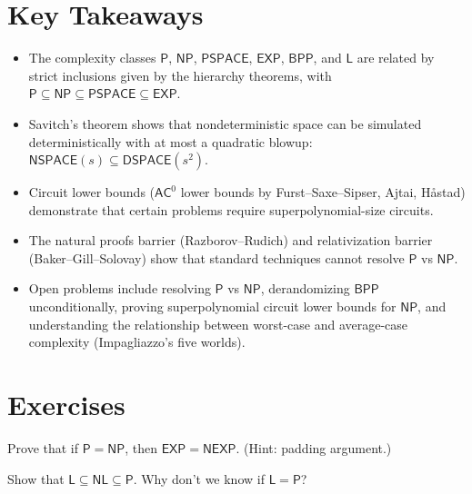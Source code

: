 \section*{Key Takeaways}
\begin{itemize}
\item The complexity classes $\mathsf{P}$, $\mathsf{NP}$, $\mathsf{PSPACE}$, $\mathsf{EXP}$, $\mathsf{BPP}$, and $\mathsf{L}$ are related by strict inclusions given by the hierarchy theorems, with $\mathsf{P} \subseteq \mathsf{NP} \subseteq \mathsf{PSPACE} \subseteq \mathsf{EXP}$.
\item Savitch's theorem shows that nondeterministic space can be simulated deterministically with at most a quadratic blowup: $\mathsf{NSPACE}(s) \subseteq \mathsf{DSPACE}(s^2)$.
\item Circuit lower bounds ($\mathsf{AC}^0$ lower bounds by Furst--Saxe--Sipser, Ajtai, Håstad) demonstrate that certain problems require superpolynomial-size circuits.
\item The natural proofs barrier (Razborov--Rudich) and relativization barrier (Baker--Gill--Solovay) show that standard techniques cannot resolve $\mathsf{P}$ vs $\mathsf{NP}$.
\item Open problems include resolving $\mathsf{P}$ vs $\mathsf{NP}$, derandomizing $\mathsf{BPP}$ unconditionally, proving superpolynomial circuit lower bounds for $\mathsf{NP}$, and understanding the relationship between worst-case and average-case complexity (Impagliazzo's five worlds).
\end{itemize}

\section{Exercises}
\label{sec:complexity:exercises}

\begin{exercise}[Basic]
Prove that if $\mathsf{P} = \mathsf{NP}$, then $\mathsf{EXP} = \mathsf{NEXP}$. (Hint: padding argument.)
\end{exercise}

\begin{exercise}[Basic]
Show that $\mathsf{L} \subseteq \mathsf{NL} \subseteq \mathsf{P}$. Why don't we know if $\mathsf{L} = \mathsf{P}$?
\end{exercise}

